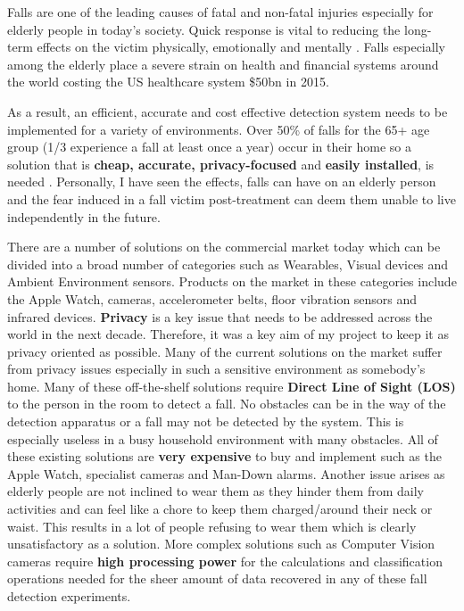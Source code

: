 Falls are one of the leading causes of fatal and non-fatal injuries especially for elderly people in today's society. Quick response is vital to reducing the long-term effects on the victim physically, emotionally and mentally \citep{dangerousFalls,stokesFall}. Falls especially among the elderly place a severe strain on health and financial systems around the world costing the US healthcare system \$50bn in 2015.\par
As a result, an efficient, accurate and cost effective detection system needs to be implemented for a variety of environments. Over 50\% of falls for the 65+ age group (1/3 experience a fall at least once a year) occur in their home so a solution that is \textbf{cheap, accurate, privacy-focused} and \textbf{easily installed}, is needed \citep{medicalFall, stokesFall}. 
Personally, I have seen the effects, falls can have on an elderly person and the fear induced in a fall victim post-treatment can deem them unable to live independently in the future. \citep{fearFall} \par
There are a number of solutions on the commercial market today which can be divided into a broad number of categories such as Wearables, Visual devices and Ambient Environment sensors. Products on the market in these categories include the Apple Watch, cameras, accelerometer belts, floor vibration sensors and infrared devices. \textbf{Privacy} is a key issue that needs to be addressed across the world in the next decade. Therefore, it was a key aim of my project to keep it as privacy oriented as possible. Many of the current solutions on the market suffer from privacy issues especially in such a sensitive environment as somebody's home. Many of these off-the-shelf solutions require \textbf{Direct Line of Sight (LOS)} to the person in the room to detect a fall. No obstacles can be in the way of the detection apparatus or a fall may not be detected by the system. This is especially useless in a busy household environment with many obstacles. All of these existing solutions are \textbf{very expensive} to buy and implement such as the Apple Watch, specialist cameras and Man-Down alarms. Another issue arises as elderly people are not inclined to wear them as they hinder them from daily activities and can feel like a chore to keep them charged/around their neck or waist. This results in a lot of people refusing to wear them which is clearly unsatisfactory as a solution. More complex solutions such as Computer Vision cameras require \textbf{high processing power} for the calculations and classification operations needed for the sheer amount of data recovered in any of these fall detection experiments. \par
